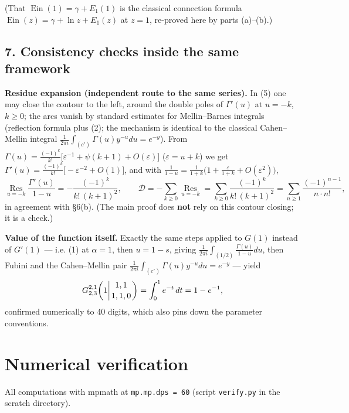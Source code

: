 \documentclass[11pt]{article}
\theoremstyle{remark}
\begin{document}
(That $\operatorname{Ein}(1)=\gamma+E_1(1)$ is the classical connection formula $\operatorname{Ein}(z)=\gamma+\ln z+E_1(z)$ at $z=1$, re-proved here by parts (a)--(b).)

\subsection*{7. Consistency checks inside the same framework}

\textbf{Residue expansion (independent route to the same series).} In (5) one may close the contour to the left, around the double poles of $\Gamma'(u)$ at $u=-k$, $k\ge0$; the arcs vanish by standard estimates for Mellin--Barnes integrals (reflection formula plus (2); the mechanism is identical to the classical Cahen--Mellin integral $\frac{1}{2\pi i}\int_{(c')}\Gamma(u)y^{-u}du=e^{-y}$). From $\Gamma(u)=\frac{(-1)^k}{k!}\bigl[\varepsilon^{-1}+\psi(k+1)+O(\varepsilon)\bigr]$ ($\varepsilon=u+k$) we get $\Gamma'(u)=\frac{(-1)^k}{k!}\bigl[-\varepsilon^{-2}+O(1)\bigr]$, and with $\frac{1}{1-u}=\frac{1}{1+k}\bigl(1+\frac{\varepsilon}{1+k}+O(\varepsilon^2)\bigr)$,
\[
\operatorname*{Res}_{u=-k}\frac{\Gamma'(u)}{1-u}=-\frac{(-1)^k}{k!\,(k+1)^2},
\qquad
\mathcal{D}=-\sum_{k\ge0}\operatorname*{Res}_{u=-k}=\sum_{k\ge0}\frac{(-1)^k}{k!\,(k+1)^2}
=\sum_{n\ge1}\frac{(-1)^{n-1}}{n\cdot n!},
\]
in agreement with \S6(b). (The main proof does \textbf{not} rely on this contour closing; it is a check.)

\textbf{Value of the function itself.} Exactly the same steps applied to $G(1)$ instead of $G'(1)$ --- i.e. (1) at $\alpha=1$, then $u=1-s$, giving $\frac{1}{2\pi i}\int_{(1/2)}\frac{\Gamma(u)}{1-u}du$, then Fubini and the Cahen--Mellin pair $\frac{1}{2\pi i}\int_{(c')}\Gamma(u)y^{-u}du=e^{-y}$ --- yield
\[
G_{2,3}^{2,1}\!\left(1\middle|{1,1\atop 1,1,0}\right)=\int_0^1 e^{-t}\,dt=1-e^{-1},
\]
confirmed numerically to 40 digits, which also pins down the parameter conventions.

\section*{Numerical verification}

All computations with mpmath at \texttt{mp.mp.dps = 60} (script \texttt{verify.py} in the scratch directory).
\end{document}
